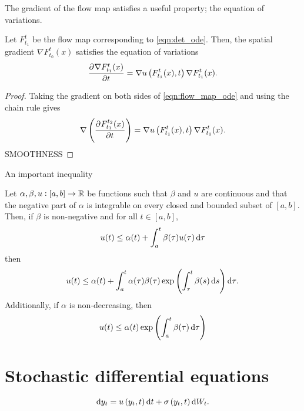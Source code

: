 The gradient of the flow map satisfies a useful property; the equation of variations.
\begin{theorem}
	Let \(F_{t_1}^{t}\) be the flow map corresponding to \eqref{eqn:det_ode}.
	Then, the spatial gradient \(\nabla F_{t_0}^t(x)\) satisfies the equation of variations
	\begin{equation}
		\dpd{\nabla F_{t_1}^{t}(x)}{t} = \nabla u\left(F_{t_1}^{t}(x), t\right) \nabla F_{t_1}^{t}(x).
		\label{eqn:eqn_of_variations}
	\end{equation}
\end{theorem}
\begin{proof}
	Taking the gradient on both sides of \eqref{eqn:flow_map_ode} and using the chain rule gives  
	\[
		\nabla\left(\dpd{F_{t_1}^{t_2}(x)}{t}\right) = \nabla u\left(F_{t_1}^{t}(x), t\right) \nabla F_{t_1}^{t}(x).
	\]
	SMOOTHNESS
\end{proof}



An important inequality

\begin{theorem}\label{thm:gronwall}
	Let \(\alpha, \beta, u: [a,b] \to \mathbb{R}\) be functions such that \(\beta\) and \(u\) are continuous and that the negative part of \(\alpha\) is integrable on every closed and bounded subset of \([a,b]\). 
	Then, if \(\beta\) is non-negative and for all \(t \in [a,b]\),
	\[
		u(t) \leq \alpha(t) + \int_a^t{\beta(\tau)u(\tau)\dif\tau}
	\]
	then 
	\[
		u(t) \leq \alpha(t) + \int_a^t{\alpha(\tau)\beta(\tau)\exp\left(\int_\tau^{t}{\beta(s)\dif s}\right)\dif\tau}.
	\]
	Additionally, if \(\alpha\) is non-decreasing, then 
	\[
		u(t) \leq \alpha(t) \exp\left(\int_a^t{\beta(\tau)\dif\tau}\right)
	\]
\end{theorem}



\section{Stochastic differential equations}


\begin{equation}
	\dif y_t = u\left(y_t, t\right)\dif t + \sigma\left(y_t, t\right)\dif W_t.
	\label{eqn:gen_sde}
\end{equation}

